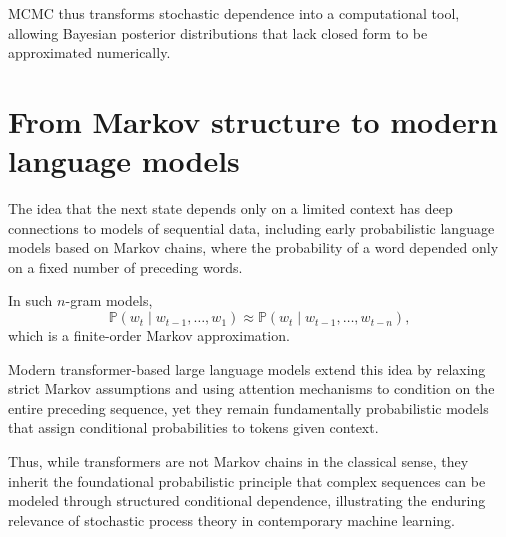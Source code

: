 MCMC thus transforms stochastic dependence into a computational tool, allowing Bayesian posterior distributions that lack closed form to be approximated numerically. 


\section{From Markov structure to modern language models}

The idea that the next state depends only on a limited context has deep connections to models of sequential data, including early probabilistic language models based on Markov chains, where the probability of a word depended only on a fixed number of preceding words. 

\medskip

In such \(n\)-gram models,
\[
\mathbb{P}(w_t \mid w_{t-1},\dots,w_1)
\approx
\mathbb{P}(w_t \mid w_{t-1},\dots,w_{t-n}),
\]
which is a finite-order Markov approximation. 

\medskip

Modern transformer-based large language models extend this idea by relaxing strict Markov assumptions and using attention mechanisms to condition on the entire preceding sequence, yet they remain fundamentally probabilistic models that assign conditional probabilities to tokens given context. 

\medskip

Thus, while transformers are not Markov chains in the classical sense, they inherit the foundational probabilistic principle that complex sequences can be modeled through structured conditional dependence, illustrating the enduring relevance of stochastic process theory in contemporary machine learning. 






